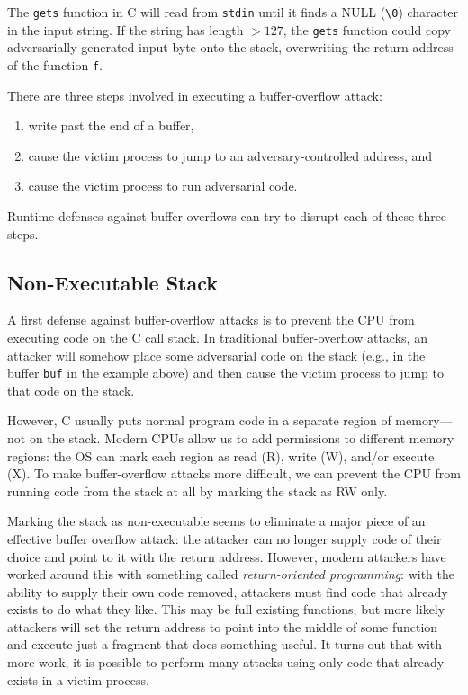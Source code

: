 The \verb|gets| function in C will read from \verb|stdin| until 
it finds a NULL (\verb|\0|) character in the input string.
If the string has length $>127$, the \verb|gets| function could
copy adversarially generated input byte onto the stack, overwriting
the return address of the function \verb|f|.

There are three steps involved in executing a buffer-overflow attack:
\begin{enumerate}
\item write past the end of a buffer, 
\item cause the victim process to jump to an adversary-controlled address, and
\item cause the victim process to run adversarial code.
\end{enumerate}

Runtime defenses against buffer overflows can try to disrupt each of 
these three steps.

\subsection{Non-Executable Stack}\label{sec:overflow:nx}
A first defense against buffer-overflow attacks is to prevent
the CPU from executing code on the C call stack.
In traditional buffer-overflow attacks, an attacker will somehow place
some adversarial code on the stack (e.g., in the buffer \verb|buf| in the 
example above) and then cause the victim process to jump to that code
on the stack.

However, C usually puts normal program code in a separate region of memory---not on the stack.
Modern CPUs allow us to add permissions to different memory regions: 
the OS can mark each region as read (R), write (W), and/or execute (X).
To make buffer-overflow attacks more difficult,
we can prevent the CPU from running code from the stack at all 
by marking the stack as RW only.

Marking the stack as non-executable seems to eliminate a major piece of an effective buffer overflow attack: the attacker can no longer supply code of their choice and point to it with the return address. However, modern attackers have worked around this with something called \emph{return-oriented programming}: with the ability to supply their own code removed, attackers must find code that already exists to do what they like.
This may be full existing functions, but more likely attackers will set the return address to point into the middle of some function and execute just a fragment that does something useful. It turns out that with more work, it is possible to perform many attacks using only code that already exists in a victim process. 

